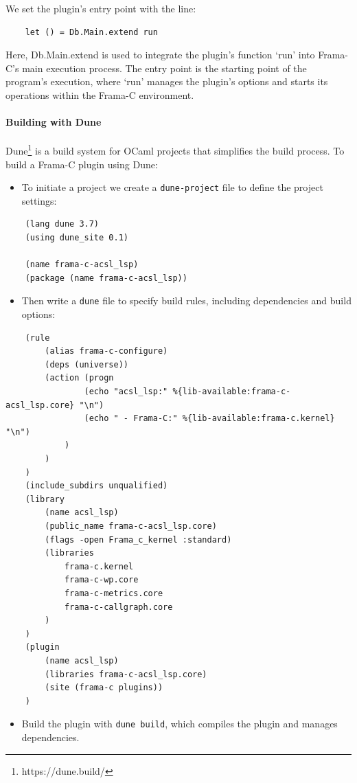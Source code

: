 \documentclass[10pt]{article}
\begin{document}
\begin{singlespace}
We set the plugin's entry point with the line:
\begin{lstlisting}
	let () = Db.Main.extend run
\end{lstlisting}
Here, Db.Main.extend is used to integrate the plugin's function `run' into Frama-C's main execution process. The entry point is the starting point of the program's execution, where `run' manages the plugin's options and starts its operations within the Frama-C environment.

\paragraph*{Building with Dune}
Dune\footnote{https://dune.build/} is a build system for OCaml projects that simplifies the build process. To build a Frama-C plugin using Dune:

\begin{itemize}
    \item[--] To initiate a project we create a \texttt{dune-project} file to define the project settings:
\end{itemize}

\begin{lstlisting}
	(lang dune 3.7)
	(using dune_site 0.1)

	(name frama-c-acsl_lsp)
	(package (name frama-c-acsl_lsp))
\end{lstlisting}

\begin{itemize}
    \item[--] Then write a \texttt{dune} file to specify build rules, including dependencies and build options:
\end{itemize}

\begin{lstlisting}
	(rule
		(alias frama-c-configure)
		(deps (universe))
		(action (progn
				(echo "acsl_lsp:" %{lib-available:frama-c-acsl_lsp.core} "\n")
				(echo " - Frama-C:" %{lib-available:frama-c.kernel} "\n")
			)
		)
	)
	(include_subdirs unqualified)
	(library
		(name acsl_lsp)
		(public_name frama-c-acsl_lsp.core)
		(flags -open Frama_c_kernel :standard)
		(libraries 
			frama-c.kernel
			frama-c-wp.core
			frama-c-metrics.core
			frama-c-callgraph.core
		)
	)
	(plugin
		(name acsl_lsp)
		(libraries frama-c-acsl_lsp.core)
		(site (frama-c plugins))
	)

\end{lstlisting}

\begin{itemize}
    \item[--] Build the plugin with \texttt{dune build}, which compiles the plugin and manages dependencies.
\end{itemize}


\end{singlespace}
\end{document}
